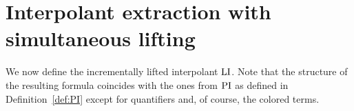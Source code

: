 


\section{Interpolant extraction with simultaneous lifting}

We now define the incrementally lifted interpolant $\operatorname{LI}$.
Note that the structure of the resulting formula coincides with the ones from $\operatorname{PI}$ as defined in Definition~\ref{def:PI} except for quantifiers and, of course, the colored terms.

